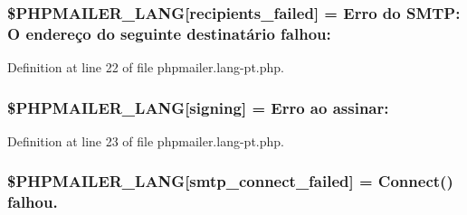 \subsubsection[{\texorpdfstring{\$\+P\+H\+P\+M\+A\+I\+L\+E\+R\+\_\+\+L\+A\+NG}{$PHPMAILER_LANG}}]{\setlength{\rightskip}{0pt plus 5cm}\$P\+H\+P\+M\+A\+I\+L\+E\+R\+\_\+\+L\+A\+NG\mbox{[}\textquotesingle{}recipients\+\_\+failed\textquotesingle{}\mbox{]} = \textquotesingle{}Erro do S\+M\+T\+P\+: O endereço do seguinte destinatário falhou\+: \textquotesingle{}}\hypertarget{phpmailer_8lang-pt_8php_a7589d30bb9b368327c2df015f3e6bcba}{}\label{phpmailer_8lang-pt_8php_a7589d30bb9b368327c2df015f3e6bcba}


Definition at line 22 of file phpmailer.\+lang-\/pt.\+php.

\subsubsection[{\texorpdfstring{\$\+P\+H\+P\+M\+A\+I\+L\+E\+R\+\_\+\+L\+A\+NG}{$PHPMAILER_LANG}}]{\setlength{\rightskip}{0pt plus 5cm}\$P\+H\+P\+M\+A\+I\+L\+E\+R\+\_\+\+L\+A\+NG\mbox{[}\textquotesingle{}signing\textquotesingle{}\mbox{]} = \textquotesingle{}Erro ao assinar\+: \textquotesingle{}}\hypertarget{phpmailer_8lang-pt_8php_a68e437bdb9b968a5a67320f03d231565}{}\label{phpmailer_8lang-pt_8php_a68e437bdb9b968a5a67320f03d231565}


Definition at line 23 of file phpmailer.\+lang-\/pt.\+php.

\subsubsection[{\texorpdfstring{\$\+P\+H\+P\+M\+A\+I\+L\+E\+R\+\_\+\+L\+A\+NG}{$PHPMAILER_LANG}}]{\setlength{\rightskip}{0pt plus 5cm}\$P\+H\+P\+M\+A\+I\+L\+E\+R\+\_\+\+L\+A\+NG\mbox{[}\textquotesingle{}smtp\+\_\+connect\+\_\+failed\textquotesingle{}\mbox{]} =  Connect() falhou.\textquotesingle{}}\hypertarget{phpmailer_8lang-pt_8php_a7b321d4ca1e9df702403ed4c61aa0980}{}\label{phpmailer_8lang-pt_8php_a7b321d4ca1e9df702403ed4c61aa0980}


